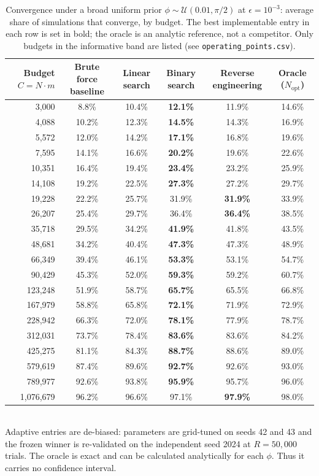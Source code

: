 \begin{table}[ht]
\centering
\small
\caption{Convergence under a broad uniform prior $\phi\sim\mathcal{U}(0.01,\pi/2)$ at $\epsilon=10^{-3}$: average share of simulations that converge, by budget. The best implementable entry in each row is set in bold; the oracle is an analytic reference, not a competitor. Only budgets in the informative band are listed (see \texttt{operating\_points.csv}).}
\label{tab:broad-pi2}
\begin{tabular}{rccccc}
\toprule
Budget $C=N\cdot m$
& Brute force baseline
& Linear search
& Binary search
& Reverse engineering
& Oracle ($N_\text{opt}$) \\
\midrule
3{,}000
& 8.8\%
& 10.4\%
& \textbf{12.1\%}
& 11.9\%
& 14.6\% \\
4{,}088
& 10.2\%
& 12.3\%
& \textbf{14.5\%}
& 14.3\%
& 16.9\% \\
5{,}572
& 12.0\%
& 14.2\%
& \textbf{17.1\%}
& 16.8\%
& 19.6\% \\
7{,}595
& 14.1\%
& 16.6\%
& \textbf{20.2\%}
& 19.6\%
& 22.6\% \\
10{,}351
& 16.4\%
& 19.4\%
& \textbf{23.4\%}
& 23.2\%
& 25.9\% \\
14{,}108
& 19.2\%
& 22.5\%
& \textbf{27.3\%}
& 27.2\%
& 29.7\% \\
19{,}228
& 22.2\%
& 25.7\%
& 31.9\%
& \textbf{31.9\%}
& 33.9\% \\
26{,}207
& 25.4\%
& 29.7\%
& 36.4\%
& \textbf{36.4\%}
& 38.5\% \\
35{,}718
& 29.5\%
& 34.2\%
& \textbf{41.9\%}
& 41.8\%
& 43.5\% \\
48{,}681
& 34.2\%
& 40.4\%
& \textbf{47.3\%}
& 47.3\%
& 48.9\% \\
66{,}349
& 39.4\%
& 46.1\%
& \textbf{53.3\%}
& 53.1\%
& 54.7\% \\
90{,}429
& 45.3\%
& 52.0\%
& \textbf{59.3\%}
& 59.2\%
& 60.7\% \\
123{,}248
& 51.9\%
& 58.7\%
& \textbf{65.7\%}
& 65.5\%
& 66.8\% \\
167{,}979
& 58.8\%
& 65.8\%
& \textbf{72.1\%}
& 71.9\%
& 72.9\% \\
228{,}942
& 66.3\%
& 72.0\%
& \textbf{78.1\%}
& 77.9\%
& 78.7\% \\
312{,}031
& 73.7\%
& 78.4\%
& \textbf{83.6\%}
& 83.6\%
& 84.2\% \\
425{,}275
& 81.1\%
& 84.3\%
& \textbf{88.7\%}
& 88.6\%
& 89.0\% \\
579{,}619
& 87.4\%
& 89.6\%
& \textbf{92.7\%}
& 92.6\%
& 93.0\% \\
789{,}977
& 92.6\%
& 93.8\%
& \textbf{95.9\%}
& 95.7\%
& 96.0\% \\
1{,}076{,}679
& 96.2\%
& 96.6\%
& 97.1\%
& \textbf{97.9\%}
& 98.0\% \\
\bottomrule
\end{tabular}
\\[2pt]
\footnotesize Adaptive entries are de-biased: parameters are grid-tuned on seeds 42 and 43 and the frozen winner is re-validated on the independent seed 2024 at $R=50{,}000$ trials. The oracle is exact and can be calculated analytically for each $\phi$. Thus it carries no confidence interval.
\end{table}
